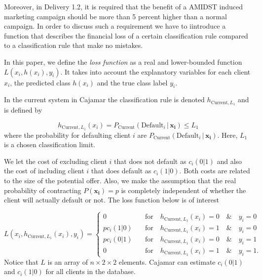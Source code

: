 \documentclass{article}
\theoremstyle{theorem}
\theoremstyle{definition}
\newcommand{\bv}[1]{\bm{#1}}
\begin{document}
Moreover, in Delivery 1.2, it is required that the benefit of a AMIDST induced marketing campaign should be more than 5 percent higher than a normal campaign.  In order to discuss such a requirement we have to iintroduce a function that describes the financial loss of a certain classification rule compared to a classification rule that make no mistakes. 

In this paper, we define the \emph{loss function} as a real and lower-bounded function $L(x_i, h(x_i), y_i)$. It takes into account the explanatory variables for each client $x_i$, the predicted class $h(x_i)$ and the true class label $y_i$. 

In the current system in Cajamar the classification rule is denoted $h_{\mbox{Current},L_1}$ and is defined by

\begin{equation}
\label{def:empRisk}
h_{\mbox{Current},L_1}(x_i) = P_{\mbox{Current}}(\mbox{Default}_i \,|\, \bv{x_i}) \leq L_1 
\end{equation}
where the probability for defaulting client $i$ are $P_{\mbox{Current}}(\mbox{Default}_i \,|\, \bv{x_i})$.  Here, $L_1$ is a chosen classification limit. 

We let the cost of excluding client $i$ that does not default as $c_i(0|1)$ and also the cost of including client $i$ that does default as $c_i(1|0)$.  Both costs are related to the size of the potential offer.  Also, we make the assumption that the real probability of contracting $P(\bv{x_i}) = p$ is completely independent of whether the client will actually default or not.  The loss function below is of interest

\begin{equation}
\label{def:empRiskBank}
L(x_i, h_{\mbox{Current},L_1}(x_i) , y_i) = 
\begin{cases}
0     &\quad \mbox{for} \quad h_{\mbox{Current},L_1}(x_i) = 0 \quad \& \quad y_i = 0\\
p c_i(1|0)    &\quad \mbox{for} \quad h_{\mbox{Current},L_1}(x_i) = 1 \quad \& \quad y_i = 0\\
p c_i(0|1)      &\quad \mbox{for} \quad h_{\mbox{Current},L_1}(x_i) = 0 \quad \& \quad y_i = 1\\
0   &\quad \mbox{for} \quad h_{\mbox{Current},L_1}(x_i) = 1 \quad \& \quad y_i = 1.
\end{cases}
\end{equation}
Notice that $L$ is an array of $n \times 2\times 2$ elements. Cajamar can estimate $c_i(0|1)$ and $c_i(1|0)$ for all clients in the database.
\end{document}

